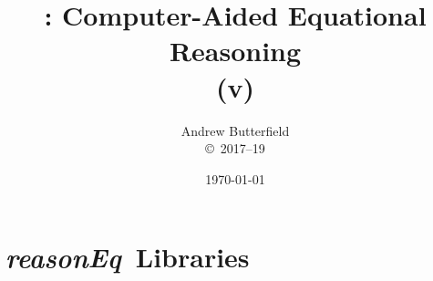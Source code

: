 \documentclass[fleqn,10pt]{report}
\author{
Andrew Butterfield
\\
{\small \copyright\ 2017--19}
}
\title{
  \reasonEq: Computer-Aided Equational Reasoning
  \\(v\reqVersion)
}
\date{
\today
}
\def\reasonEq{\textit{\textsf{reasonEq}}}
\begin{document}
\maketitle
\tableofcontents

%
% 

\chapter{\reasonEq\ Libraries}

%
% 
\newpage

\newpage

\newpage

% 
% 
% 
% 
% 
% 
% 
\newpage

% 
% 
\newpage

% 
% 
\newpage

% 
% 
% 
% 
% 
% 
% 
% 
% 

%
%
%

%
\end{document}
